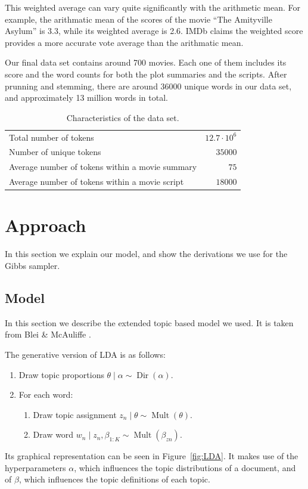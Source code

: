 \documentclass{article} %
\DeclareMathOperator{\Dir}{Dir}
\DeclareMathOperator{\Mult}{Mult}
\begin{document}
This weighted average can vary quite significantly with the arithmetic mean. 
For example, the arithmatic mean of the scores of the movie ``The Amityville Asylum'' is 3.3, while its weighted average is 2.6.
IMDb claims the weighted score provides a more accurate vote average than the arithmatic mean.

Our final data set contains around 700 movies. Each one of them includes its score and the word counts for both the plot summaries and the scripts. After prunning and stemming, there are around 36000 unique words in our data set, and approximately 13 million words in total.

\begin{table}[ht!]
\caption{Characteristics of the data set.}
\label{table:data_set}
\begin{center}
\begin{tabular}{lr}
Total number of tokens & \(12.7\cdot 10^6\)\\
Number of unique tokens & \(35000\)\\
Average number of tokens within a movie summary & \(75\)\\
Average number of tokens within a movie script & \(18000\)
\end{tabular}
\end{center}
\end{table}


\section{Approach}
\label{sec:approach}
In this section we explain our model, and show the derivations we use for the Gibbs sampler.

\subsection{Model}
In this section we describe the extended topic based model we used.
It is taken from Blei \& McAuliffe \cite{SLDA}.

The generative version of LDA is as follows:
\begin{enumerate}
  \item Draw topic proportions $\theta \mid \alpha \sim \Dir(\alpha)$.
  \item For each word:
  \begin{enumerate}
    \item Draw topic assignment $z_n \mid \theta \sim \Mult(\theta)$.
    \item Draw word $w_n \mid z_n, \beta_{1:K} \sim \Mult(\beta_{zn})$.
  \end{enumerate}
\end{enumerate}
Its graphical representation can be seen in Figure~\ref{fig:LDA}.
It makes use of the hyperparameters $\alpha$, which influences the topic distributions of a document, and of $\beta$, which influences the topic definitions of each topic.
\end{document}

